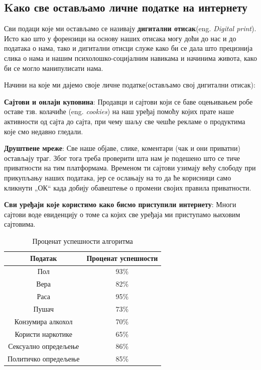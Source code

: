 \documentclass[a4paper]{article}
\begin{document}
\subsection{Kако све остављамо личне податке на интернету}

Сви подаци које ми остављамо се називају \textbf{дигитални отисак}(eng. \emph{Digital print}). Исто као што у форензици на основу наших отисака могу доћи до нас и до података о нама, тако и дигитални отисци служе како би се дала што прецизнија слика о нама и нашим психолошко-социјалним навикама и начинима живота, како би се могло манипулисати нама.

Начини на које ми дајемо своје личне податке(остављамо свој дигитални отисак):

\textbf{Сајтови и онлајн куповина}:
Продавци и сајтови који се баве оцењивањем робе оставе тзв. колачиће (eng. \emph{cookies}) на наш уређај помоћу којих прате наше активности од сајта до сајта, при чему шаљу све чешће рекламе о продуктима које смо недавно гледали.

\textbf{Друштвене мреже}:
Све наше објаве, слике, коментари (чак и они приватни) остављају траг. Због тога треба проверити шта нам је подешено што се тиче приватности на тим платформама. Временом ти сајтови узимају већу слободу при прикупљању наших података, јер се ослањају на то да ће корисници само кликнути „ОК“ када добију обавештење о промени својих правила приватности.

\textbf{Сви уређаји које користимо како бисмо приступили интернету}:
Многи сајтови воде евиденцију о томе са којих све уређаја ми приступамо њиховим сајтовима.


\begin{table}[!h]

\begin{center}

\begin{tabular}{|c|c|} \hline
\textbf{Податак} &\textbf{Проценат успешности}\\ \hline
Пол &93\% \\ \hline
Вера &82\%\\ \hline
Раса & 95\%\\ \hline
Пушач &73\% \\ \hline
Конзумира алкохол &70\% \\ \hline
Користи наркотике & 65\% \\ \hline
Сексуално опредељење &86\% \\ \hline
Политичко опредељење &85\% \\ \hline

\end{tabular}
\label{tab:tabel1}
\caption{Проценат успешности алгоритма}
\end{center}
\end{table}
\end{document}
